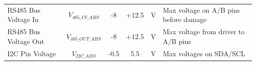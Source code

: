 \documentclass[10pt]{datasheet}
\begin{document}
\begin{table}[H]
\begin{tabularx}{\textwidth}{l | c | c c | c | X}
    \hline
    RS485 Bus Voltage In   & $V_{485\_IN\_ABS}$ & -8 & +12.5 & V & Max voltage on A/B pins before damage \\
    RS485 Bus Voltage Out   & $V_{485\_OUT\_ABS}$ & -8 & +12.5 & V & Max voltage from driver to A/B pins \\
    I2C Pin Voltage     & $V_{I2C\_ABS}$ & -0.5 & 5.5 & V & Max voltages on SDA/SCL \\
    \hline
\end{tabularx}
\end{table}



\clearpage
\end{document}
